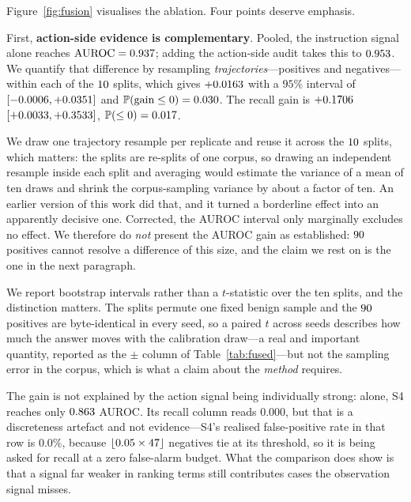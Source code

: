 \documentclass[preprint,12pt,number]{elsarticle}
\theoremstyle{definition}
\newcommand{\Prob}{\mathbb{P}}
\begin{document}
Figure~\ref{fig:fusion} visualises the ablation. Four points deserve emphasis.

First, \textbf{action-side evidence is complementary}. Pooled, the instruction
signal alone reaches $\mathrm{AUROC} = 0.937$; adding the action-side
audit takes this to $0.953$. We quantify that difference by resampling
\emph{trajectories}---positives and negatives---within each of the $10$
splits, which gives $+0.0163$ with a $95\%$ interval of
$[-0.0006, +0.0351]$ and $\Prob(\text{gain} \le 0) =
\BootGainAurocP$. The recall gain is $+0.1706$
$[+0.0033, +0.3533]$, $\Prob(\le 0) = \BootGainTprP$.

We draw one trajectory resample per replicate and reuse it across the $10$
splits, which matters: the splits are re-splits of one corpus, so drawing an
independent resample inside each split and averaging would estimate the variance of
a mean of ten draws and shrink the corpus-sampling variance by about a factor of
ten. An earlier version of this work did that, and it turned a borderline effect
into an apparently decisive one. Corrected, the AUROC interval only marginally
excludes no effect. We therefore do \emph{not} present the AUROC gain as
established: $90$ positives cannot resolve a difference of this size, and the
claim we rest on is the one in the next paragraph.

We report bootstrap intervals rather than a $t$-statistic over the ten splits, and
the distinction matters. The splits permute one fixed benign sample and the
$90$ positives are byte-identical in every seed, so a paired $t$ across seeds
describes how much the answer moves with the calibration draw---a real and
important quantity, reported as the $\pm$ column of Table~\ref{tab:fused}---but not
the sampling error in the corpus, which is what a claim about the \emph{method}
requires.

The gain is not explained by the action signal being individually strong: alone, S4
reaches only $0.863$ AUROC. Its recall column reads $0.000$, but that is a
discreteness artefact and not evidence---S4's realised false-positive rate in that
row is $0.0\%$, because $\lfloor 0.05 \times 47 \rfloor$ negatives tie at its
threshold, so it is being asked for recall at a zero false-alarm budget. What the
comparison does show is that a signal far weaker in ranking terms still contributes
cases the observation signal misses.
\end{document}
